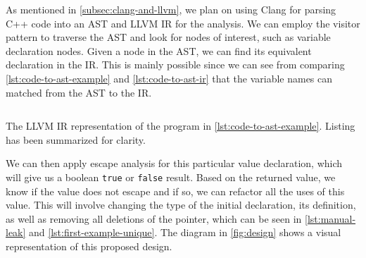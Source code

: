 \documentclass{proposal}
\begin{document}
    As mentioned in \autoref{subsec:clang-and-llvm}, we plan on using Clang for parsing C++ code into an AST and LLVM IR for the analysis.
    We can employ the visitor pattern to traverse the AST and look for nodes of interest, such as variable declaration nodes.
    Given a node in the AST, we can find its equivalent declaration in the IR\@.
    This is mainly possible since we can see from comparing \autoref{lst:code-to-ast-example} and \autoref{lst:code-to-ast-ir} that the variable names can matched from the AST to the IR\@.

    \begin{listing}
        \inputminted[fontsize=\footnotesize, breaklines]{llvm}{code/code-to-ast-summary.ll}
        \caption{The LLVM IR representation of the program in \autoref{lst:code-to-ast-example}. Listing has been summarized for clarity.}
        \label{lst:code-to-ast-ir}
    \end{listing}

    We can then apply escape analysis for this particular value declaration, which will give us a boolean \texttt{true} or \texttt{false} result.
    Based on the returned value, we know if the value does not escape and if so, we can refactor all the uses of this value.
    This will involve changing the type of the initial declaration, its definition, as well as removing all deletions of the pointer, which can be seen in \autoref{lst:manual-leak} and \autoref{lst:first-example-unique}.
    The diagram in \autoref{fig:design} shows a visual representation of this proposed design.
\end{document}
